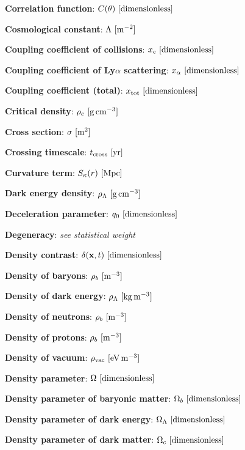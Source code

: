 \documentclass[a4paper,11pt]{article}
\begin{document}
{\noindent}\textbf{Correlation function}: $C(\theta) ~ [{\rm dimensionless}]$

{\noindent}\textbf{Cosmological constant}: $\Lambda ~ [{\rm m^{-2}}]$

{\noindent}\textbf{Coupling coefficient of collisions}: $x_c ~ [{\rm dimensionless}]$

{\noindent}\textbf{Coupling coefficient of Ly$\alpha$ scattering}: $x_\alpha ~ [{\rm dimensionless}]$

{\noindent}\textbf{Coupling coefficient (total)}: $x_\mathrm{tot} ~ [{\rm dimensionless}]$

{\noindent}\textbf{Critical density}: $\rho_c ~ [{\rm g\,cm^{-3}}]$

{\noindent}\textbf{Cross section}: $\sigma ~ [{\rm m^{2}}]$

{\noindent}\textbf{Crossing timescale}: $t_\mathrm{cross} ~ [{\rm yr}]$

{\noindent}\textbf{Curvature term}: $S_\kappa(r) ~ [{\rm Mpc}]$

{\noindent}\textbf{Dark energy density}: $\rho_\Lambda ~ [{\rm g\,cm^{-3}}]$

{\noindent}\textbf{Deceleration parameter}: $q_0 ~ [{\rm dimensionless}]$

{\noindent}\textbf{Degeneracy}: \textit{see statistical weight}

{\noindent}\textbf{Density contrast}: $\delta(\mathbf{x},t) ~ [{\rm dimensionless}]$

{\noindent}\textbf{Density of baryons}: $\rho_b ~ [{\rm m^{-3}}]$

{\noindent}\textbf{Density of dark energy}: $\rho_\Lambda ~ [{\rm kg\,m^{-3}}]$

{\noindent}\textbf{Density of neutrons}: $\rho_b ~ [{\rm m^{-3}}]$

{\noindent}\textbf{Density of protons}: $\rho_b ~ [{\rm m^{-3}}]$

{\noindent}\textbf{Density of vacuum}: $\rho_\mathrm{vac} ~ [{\rm eV\,m^{-3}}]$

{\noindent}\textbf{Density parameter}: $\Omega ~ [{\rm dimensionless}]$

{\noindent}\textbf{Density parameter of baryonic matter}: $\Omega_b ~ [{\rm dimensionless}]$

{\noindent}\textbf{Density parameter of dark energy}: $\Omega_\Lambda ~ [{\rm dimensionless}]$

{\noindent}\textbf{Density parameter of dark matter}: $\Omega_c ~ [{\rm dimensionless}]$
\end{document}
